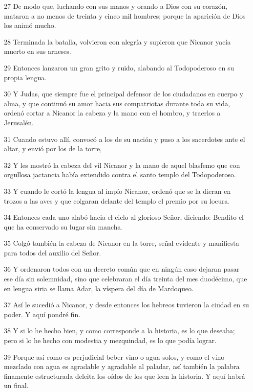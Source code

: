 \par 27 De modo que, luchando con sus manos y orando a Dios con su corazón, mataron a no menos de treinta y cinco mil hombres; porque la aparición de Dios los animó mucho.
\par 28 Terminada la batalla, volvieron con alegría y supieron que Nicanor yacía muerto en sus arneses.
\par 29 Entonces lanzaron un gran grito y ruido, alabando al Todopoderoso en su propia lengua.
\par 30 Y Judas, que siempre fue el principal defensor de los ciudadanos en cuerpo y alma, y ​​que continuó su amor hacia sus compatriotas durante toda su vida, ordenó cortar a Nicanor la cabeza y la mano con el hombro, y traerlos a Jerusalén.
\par 31 Cuando estuvo allí, convocó a los de su nación y puso a los sacerdotes ante el altar, y envió por los de la torre,
\par 32 Y les mostró la cabeza del vil Nicanor y la mano de aquel blasfemo que con orgullosa jactancia había extendido contra el santo templo del Todopoderoso.
\par 33 Y cuando le cortó la lengua al impío Nicanor, ordenó que se la dieran en trozos a las aves y que colgaran delante del templo el premio por su locura.
\par 34 Entonces cada uno alabó hacia el cielo al glorioso Señor, diciendo: Bendito el que ha conservado su lugar sin mancha.
\par 35 Colgó también la cabeza de Nicanor en la torre, señal evidente y manifiesta para todos del auxilio del Señor.
\par 36 Y ordenaron todos con un decreto común que en ningún caso dejaran pasar ese día sin solemnidad, sino que celebraran el día treinta del mes duodécimo, que en lengua siria se llama Adar, la víspera del día de Mardoqueo.
\par 37 Así le sucedió a Nicanor, y desde entonces los hebreos tuvieron la ciudad en su poder. Y aquí pondré fin.
\par 38 Y si lo he hecho bien, y como corresponde a la historia, es lo que deseaba; pero si lo he hecho con modestia y mezquindad, es lo que podía lograr.
\par 39 Porque así como es perjudicial beber vino o agua solos, y como el vino mezclado con agua es agradable y agradable al paladar, así también la palabra finamente estructurada deleita los oídos de los que leen la historia. Y aquí habrá un final.

